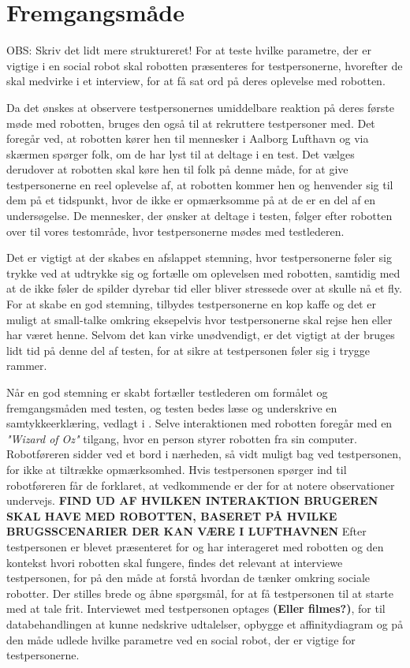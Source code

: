 \section{Fremgangsmåde}
\label{ParametreFremgangsmaade}
%
OBS: Skriv det lidt mere struktureret!\blankline
%
For at teste hvilke parametre, der er vigtige i en social robot skal robotten præsenteres for testpersonerne, hvorefter de skal medvirke i et interview, for at få sat ord på deres oplevelse med robotten. 

Da det ønskes at observere testpersonernes umiddelbare reaktion på deres første møde med robotten, bruges den også til at rekruttere testpersoner med. Det foregår ved, at robotten kører hen til mennesker i Aalborg Lufthavn og via skærmen spørger folk, om de har lyst til at deltage i en test. Det vælges derudover at robotten skal køre hen til folk på denne måde, for at give testpersonerne en reel oplevelse af, at robotten kommer hen og henvender sig til dem på et tidspunkt, hvor de ikke er opmærksomme på at de er en del af en undersøgelse. De mennesker, der ønsker at deltage i testen, følger efter robotten over til vores testområde, hvor testpersonerne mødes med testlederen.\blankline

Det er vigtigt at der skabes en afslappet stemning, hvor testpersonerne føler sig trykke ved at udtrykke sig og fortælle om oplevelsen med robotten, samtidig med at de ikke føler de spilder dyrebar tid eller bliver stressede over at skulle nå et fly. For at skabe en god stemning, tilbydes testpersonerne en kop kaffe og det er muligt at small-talke omkring eksepelvis hvor testpersonerne skal rejse hen eller har været henne. Selvom det kan virke unødvendigt, er det vigtigt at der bruges lidt tid på denne del af testen, for at sikre at testpersonen føler sig i trygge rammer. 

Når en god stemning er skabt fortæller testlederen om formålet og fremgangsmåden med testen, og testen bedes læse og underskrive en samtykkeerklæring, vedlagt i .\blankline
%
Selve interaktionen med robotten foregår med en \textit{"Wizard of Oz"} tilgang, hvor en person styrer robotten fra sin computer. Robotføreren sidder ved et bord i nærheden, så vidt muligt bag ved testpersonen, for ikke at tiltrække opmærksomhed. Hvis testpersonen spørger ind til robotføreren får de forklaret, at vedkommende er der for at notere observationer undervejs. 
\textbf{FIND UD AF HVILKEN INTERAKTION BRUGEREN SKAL HAVE MED ROBOTTEN, BASERET PÅ HVILKE BRUGSSCENARIER DER KAN VÆRE I LUFTHAVNEN} \blankline
%
Efter testpersonen er blevet præsenteret for og har interageret med robotten og den kontekst hvori robotten skal fungere, findes det relevant at interviewe testpersonen, for på den måde at forstå hvordan de tænker omkring sociale robotter. Der stilles brede og åbne spørgsmål, for at få testpersonen til at starte med at tale frit. Interviewet med testpersonen optages \textbf{(Eller filmes?)}, for til databehandlingen at kunne nedskrive udtalelser, opbygge et affinitydiagram og på den måde udlede hvilke parametre ved en social robot, der er vigtige for testpersonerne.
